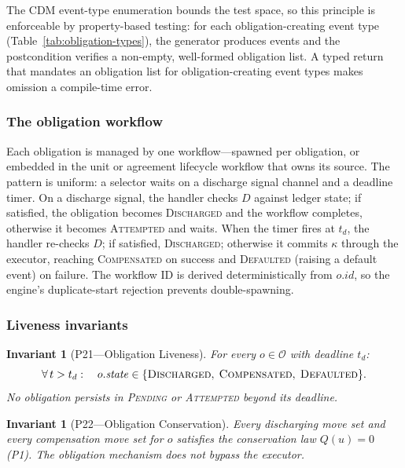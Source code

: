 \documentclass[11pt,a4paper]{article}
\newtheorem{invariant}[definition]{Invariant}
\begin{document}
\noindent The CDM event-type enumeration bounds the test space, so this principle is enforceable by property-based testing: for each obligation-creating event type (Table~\ref{tab:obligation-types}), the generator produces events and the postcondition verifies a non-empty, well-formed obligation list. A typed return that mandates an obligation list for obligation-creating event types makes omission a compile-time error.

\subsubsection{The obligation workflow}
\label{sec:obligation-workflow}

Each obligation is managed by one workflow---spawned per obligation, or embedded in the unit or agreement lifecycle workflow that owns its source. The pattern is uniform: a selector waits on a discharge signal channel and a deadline timer. On a discharge signal, the handler checks $D$ against ledger state; if satisfied, the obligation becomes \textsc{Discharged} and the workflow completes, otherwise it becomes \textsc{Attempted} and waits. When the timer fires at $t_d$, the handler re-checks $D$; if satisfied, \textsc{Discharged}; otherwise it commits $\kappa$ through the executor, reaching \textsc{Compensated} on success and \textsc{Defaulted} (raising a default event) on failure. The workflow ID is derived deterministically from $o.\mathit{id}$, so the engine's duplicate-start rejection prevents double-spawning.

\subsubsection{Liveness invariants}
\label{sec:obligation-invariants}

\begin{invariant}[P21---Obligation Liveness]
\label{inv:P21}\label{inv:obligation-liveness}
For every $o \in \mathcal{O}$ with deadline $t_d$:
\[
\forall\, t > t_d : \quad o.\mathit{state} \in \{\textsc{Discharged},\; \textsc{Compensated},\; \textsc{Defaulted}\}.
\]
No obligation persists in \textsc{Pending} or \textsc{Attempted} beyond its deadline.
\end{invariant}

\begin{invariant}[P22---Obligation Conservation]
\label{inv:P22}\label{inv:obligation-conservation}
Every discharging move set and every compensation move set for $o$ satisfies the conservation law $Q(u) = 0$ (P1). The obligation mechanism does not bypass the executor.
\end{invariant}
\end{document}
